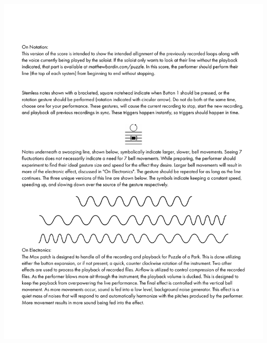     \begin{center}
    \includegraphics[scale=0.75]{Scores/puzzlePart4.pdf}
    \end{center}
    \newpage
